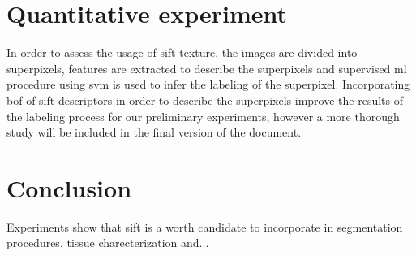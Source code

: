\documentclass[a4paper, 10pt, conference]{llncs}      %
\begin{document}
\section{Quantitative experiment}
In order to assess the usage of \ac{sift} texture, the images are divided into superpixels, features are extracted to describe the superpixels and supervised \ac{ml} procedure using \ac{svm} is used to infer the labeling of the superpixel. Incorporating \ac{bof} of \ac{sift} descriptors in order to describe the superpixels improve the results of the labeling process for our preliminary experiments, however a more thorough study will be included in the final version of the document.

\section{Conclusion}
Experiments show that \ac{sift} is a worth candidate to incorporate in segmentation procedures, tissue charecterization and... 


\newpage
%


\end{document}
